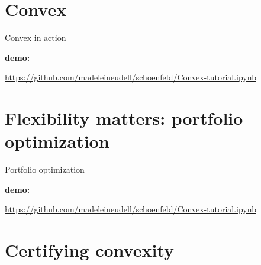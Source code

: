 \documentclass[presentation]{beamer}
\newcommand{\convex}{Convex\xspace}
\begin{document}
%
%

\section{\convex}

\begin{frame}{\convex in action}

\textbf{demo:}
\begin{center}
\url{https://github.com/madeleineudell/schoenfeld/Convex-tutorial.ipynb}
\end{center}

\end{frame}

\section{Flexibility matters: portfolio optimization}

\begin{frame}{Portfolio optimization}

\textbf{demo:}
\begin{center}
\url{https://github.com/madeleineudell/schoenfeld/Convex-tutorial.ipynb}
\end{center}

\end{frame}

\section{Certifying convexity}
\end{document}
